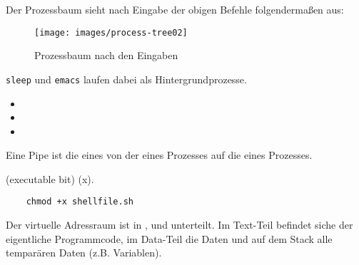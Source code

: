 \begin{answer}
  Der Prozessbaum sieht nach Eingabe der obigen Befehle folgendermaßen aus:
  \begin{figure}[H]
    \caption{Prozessbaum nach den Eingaben}
    \centering
    \texttt{[image: images/process-tree02]}
  \end{figure}
  \texttt{sleep} und \texttt{emacs} laufen dabei als Hintergrundprozesse.
\end{answer}


\begin{answer}
  \begin{itemize}
  \item {}
  \item {}
  \item {}
  \end{itemize}

\end{answer}

\begin{answer}
  Eine Pipe ist die  eines  von der  eines Prozesses auf die  eines Prozesses.
\end{answer}

\begin{answer}
   (executable bit) (x). \\

  \begin{lstlisting}
    chmod +x shellfile.sh
  \end{lstlisting}

\end{answer}

\begin{answer}
  Der virtuelle Adressraum ist in ,  und  unterteilt. Im Text-Teil befindet siche
  der eigentliche Programmcode, im Data-Teil die Daten und auf dem Stack alle temparären
  Daten (z.B. Variablen).
\end{answer}

